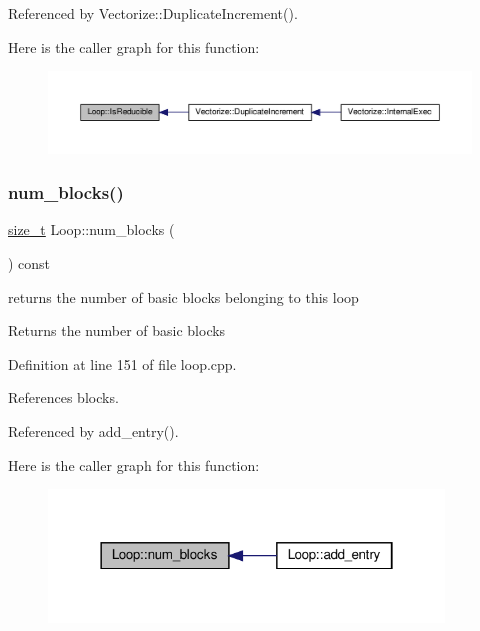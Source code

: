 Referenced by Vectorize\+::\+Duplicate\+Increment().

Here is the caller graph for this function\+:
\nopagebreak
\begin{figure}[H]
\begin{center}
\leavevmode
\includegraphics[width=350pt]{de/d77/classLoop_a0b2086cd13346ead18b13a3fa56558d5_icgraph}
\end{center}
\end{figure}
\mbox{\label{classLoop_aa9eaa0a85c8edd71ab63481878e2c799}} 
\subsubsection{\texorpdfstring{num\+\_\+blocks()}{num\_blocks()}}
{\footnotesize\ttfamily \hyperlink{tutorial__fpt__2017_2intro_2sixth_2test_8c_a7c94ea6f8948649f8d181ae55911eeaf}{size\+\_\+t} Loop\+::num\+\_\+blocks (\begin{DoxyParamCaption}{ }\end{DoxyParamCaption}) const}



returns the number of basic blocks belonging to this loop 

\begin{DoxyReturn}{Returns}
the number of basic blocks 
\end{DoxyReturn}


Definition at line 151 of file loop.\+cpp.



References blocks.



Referenced by add\+\_\+entry().

Here is the caller graph for this function\+:
\nopagebreak
\begin{figure}[H]
\begin{center}
\leavevmode
\includegraphics[width=298pt]{de/d77/classLoop_aa9eaa0a85c8edd71ab63481878e2c799_icgraph}
\end{center}
\end{figure}
\mbox{\label{classLoop_afbbd557703452bcebd167cf707759d51}} 
